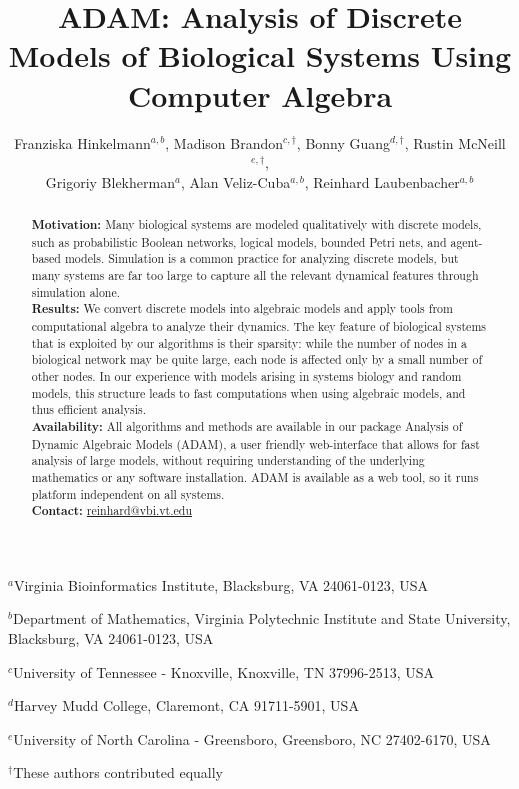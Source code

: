 \documentclass[10pt]{bmc_article}
\title{ADAM: Analysis of Discrete Models of Biological
Systems Using Computer Algebra}
\author{Franziska Hinkelmann$^{a,b}$,
Madison Brandon$^{c,\dagger}$,
Bonny Guang$^{d,\dagger}$,
Rustin McNeill$^{e,\dagger}$, \\
Grigoriy Blekherman$^{a}$,
Alan Veliz-Cuba$^{a,b}$,
Reinhard Laubenbacher$^{a,b}$}
\begin{document}
\maketitle
{\footnotesize
            \centerline{$^a$Virginia Bioinformatics Institute, Blacksburg, VA 24061-0123, USA}
}
{\footnotesize
            \centerline{$^b$Department of Mathematics,
             Virginia Polytechnic Institute and State University, Blacksburg, VA 24061-0123, USA}
}
{\footnotesize
            \centerline{$^c$University of Tennessee - Knoxville, Knoxville, TN 37996-2513, USA}
}
{\footnotesize
            \centerline{$^d$Harvey Mudd College, Claremont, CA 91711-5901, USA}
}
{\footnotesize
            \centerline{$^e$University of North Carolina - Greensboro, Greensboro, NC 27402-6170, USA}
}
{\footnotesize
            \centerline{$^\dagger$These authors contributed equally}
}
\begin{abstract}
{\bf Motivation:} Many biological systems are modeled qualitatively with discrete models, such as
probabilistic Boolean networks, logical models, bounded Petri nets, and agent-based models.
Simulation is a common practice for analyzing discrete models, but many systems are far too large
to capture all the relevant dynamical features through simulation alone. \\
{\bf Results:} We convert discrete models into algebraic models
and apply tools from computational algebra to analyze their dynamics.
The key feature of biological systems that is exploited by our algorithms is their sparsity: while the number of nodes in a
biological network may be quite large, each node is affected only by a small number of other nodes. In our experience with models arising in systems biology and random models, this structure leads to fast
computations when using algebraic models, and thus efficient analysis.\\
{\bf Availability:} All algorithms and methods are available in our package Analysis of Dynamic
Algebraic Models (ADAM), a user friendly web-interface
that allows for fast analysis of large models, without requiring understanding of the underlying mathematics or any software installation. ADAM is available as a web tool, so it runs platform independent on all systems.\\
{\bf Contact:} \href{mailto:reinhard@vbi.vt.edu}{reinhard@vbi.vt.edu}\\
\end{abstract}
\end{document}

